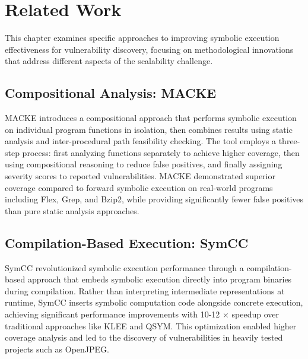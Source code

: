 \chapter{Related Work}

This chapter examines specific approaches to improving symbolic execution effectiveness for vulnerability discovery, focusing on methodological innovations that address different aspects of the scalability challenge.

\section{Compositional Analysis: MACKE}

MACKE \cite{ognawala_macke_2016} introduces a compositional approach that performs symbolic execution on individual program functions in isolation, then combines results using static analysis and inter-procedural path feasibility checking. The tool employs a three-step process: first analyzing functions separately to achieve higher coverage, then using compositional reasoning to reduce false positives, and finally assigning severity scores to reported vulnerabilities. MACKE demonstrated superior coverage compared to forward symbolic execution on real-world programs including Flex, Grep, and Bzip2, while providing significantly fewer false positives than pure static analysis approaches.

\section{Compilation-Based Execution: SymCC}

SymCC \cite{poeplau_symbolic_2020} revolutionized symbolic execution performance through a compilation-based approach that embeds symbolic execution directly into program binaries during compilation. Rather than interpreting intermediate representations at runtime, SymCC inserts symbolic computation code alongside concrete execution, achieving significant performance improvements with 10-12 $\times$ speedup over traditional approaches like KLEE and QSYM. This optimization enabled higher coverage analysis and led to the discovery of vulnerabilities in heavily tested projects such as OpenJPEG.

